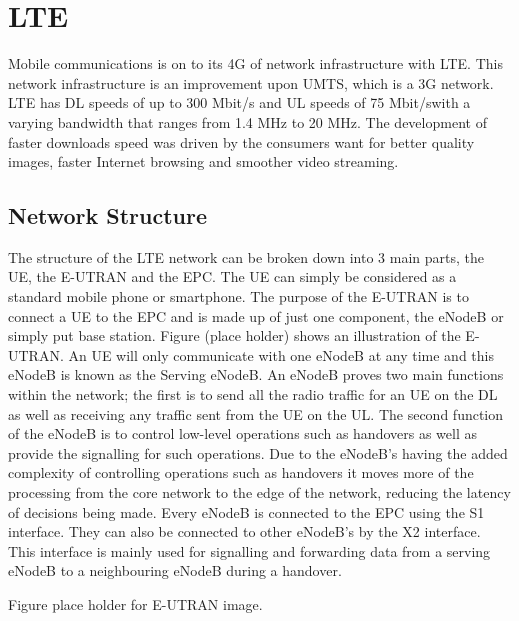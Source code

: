 \chapter{LTE}\label{lte}
Mobile communications is on to its \ac{4G} of network infrastructure with \ac{LTE}. This network infrastructure is an improvement upon \ac{UMTS}, which is a \ac{3G} network. \ac{LTE} has \ac{DL} speeds of up to 300 Mbit/s and \ac{UL} speeds of 75 Mbit/swith a varying bandwidth that ranges from 1.4 MHz to 20 MHz. The development of faster downloads speed was driven by the consumers want for better quality images, faster Internet browsing and smoother video streaming.~\cite{cox2012introduction}

\section{Network Structure}\label{network structure}
The structure of the LTE network can be broken down into 3 main parts, the \ac{UE}, the \ac{E-UTRAN} and the \ac{EPC}. The UE can simply be considered as a standard mobile phone or smartphone. The purpose of the E-UTRAN is to connect a UE to the EPC and is made up of just one component, the \ac{eNodeB} or simply put base station. Figure (place holder) shows an illustration of the E-UTRAN. An UE will only communicate with one eNodeB at any time and this eNodeB is known as the Serving eNodeB. An eNodeB proves two main functions within the network; the first is to send all the radio traffic for an UE on the DL as well as receiving any traffic sent from the UE on the UL. The second function of the eNodeB is to control low-level operations such as handovers as well as provide the signalling for such operations. Due to the eNodeB's having the added complexity of controlling operations such as handovers it moves more of the processing from the core network to the edge of the network, reducing the latency of decisions being made. Every eNodeB is connected to the EPC using the S1 interface. They can also be connected to other eNodeB's by the X2 interface. This interface is mainly used for signalling and forwarding data from a serving eNodeB to a neighbouring eNodeB during a handover.

Figure place holder for E-UTRAN image.

